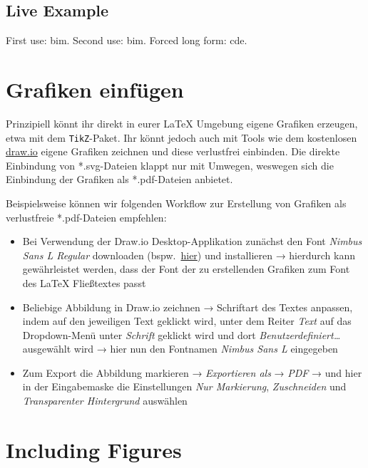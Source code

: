   \subsection{Live Example}
  First use: \ac{bim}. Second use: \ac{bim}. Forced long form: \acf{cde}.
\fi


\ifnum{}
  \section{Grafiken einfügen}

  Prinzipiell könnt ihr direkt in eurer \LaTeX{} Umgebung eigene Grafiken erzeugen, etwa mit dem \texttt{TikZ}-Paket. Ihr könnt jedoch auch mit Tools wie dem kostenlosen \href{https://www.drawio.com/}{draw.io} eigene Grafiken zeichnen und diese verlustfrei einbinden. Die direkte Einbindung von *.svg-Dateien klappt nur mit Umwegen, weswegen sich die Einbindung der Grafiken als *.pdf-Dateien anbietet.

  Beispielsweise können wir folgenden Workflow zur Erstellung von Grafiken als verlustfreie *.pdf-Dateien empfehlen:
  \begin{itemize}
    \item Bei Verwendung der Draw.io Desktop-Applikation zunächst den Font \textit{Nimbus Sans L Regular} downloaden (bspw.\ \href{https://www.1001fonts.com/nimbus-sans-l-font.html}{hier}) und installieren → hierdurch kann gewährleistet werden, dass der Font der zu erstellenden Grafiken zum Font des \LaTeX{} Fließtextes passt
    \item Beliebige Abbildung in Draw.io zeichnen → Schriftart des Textes anpassen, indem auf den jeweiligen Text geklickt wird, unter dem Reiter \textit{Text} auf das Dropdown-Menü unter \textit{Schrift} geklickt wird und dort \textit{Benutzerdefiniert\ldots} ausgewählt wird → hier nun den Fontnamen \textit{Nimbus Sans L} eingegeben
    \item Zum Export die Abbildung markieren → \textit{Exportieren als} → \textit{PDF} → und hier in der Eingabemaske die Einstellungen \textit{Nur Markierung}, \textit{Zuschneiden} und \textit{Transparenter Hintergrund} auswählen
  \end{itemize}
\else
  \section{Including Figures}

